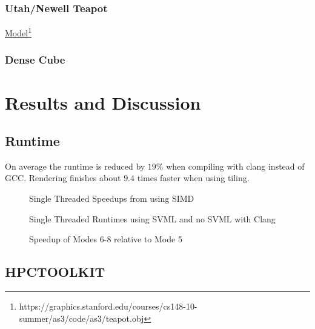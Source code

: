 \documentclass[a4paper, 11pt]{memoir}
\begin{document}
    \subsection{Utah/Newell Teapot}
    \href{https://graphics.stanford.edu/courses/cs148-10-summer/as3/code/as3/teapot.obj}{Model}\footnote{https://graphics.stanford.edu/courses/cs148-10-summer/as3/code/as3/teapot.obj}
    \subsection{Dense Cube}
    
    \chapter{Results and Discussion}
    \section{Runtime}
 
    On average the runtime is reduced by $19\%$ when compiling with clang instead of GCC.
    Rendering finishes about $9.4$ times faster when using tiling.

    \begin{figure}[H]
        \centering
        
        \caption{Single Threaded Speedups from using SIMD}
        \label{fig:runtimes_st_gcc_v_clang}
    \end{figure}

    \begin{figure}[H]
        \centering
        
        \caption{Single Threaded Runtimes using SVML and no SVML with Clang}
        \label{fig:runtimes_st_svml_v_no}
    \end{figure}

    \begin{figure}[H]
        \centering
        
        \caption{Speedup of Modes 6-8 relative to Mode 5}
        \label{fig:runtimes_st_v_mt}
    \end{figure}

    \section{HPCTOOLKIT}
    \cite{hpc_toolkit}
\end{document}
